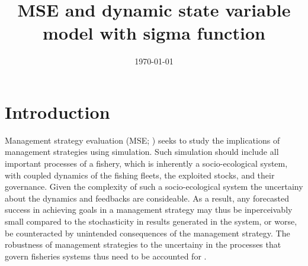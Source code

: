 \documentclass[12pt,oneline,a4paper,numbib]{ouparticle}
\numberwithin{equation}{subsection} %
\begin{document}
\title{MSE and dynamic state variable model with sigma function}

\author{%
\address{European Commission, Joint Research Centre (JRC), Sustainable Resources Directorate, Water and Marine Resources Unit, Via Enrico Fermi 2749, 21027 Ispra, Italy.}
\and
{}
\address{Wageningen Marine Research, PO Box 68, 1970 AB IJmuiden, The Netherlands.}
}


\date{\today}


\maketitle


\section{Introduction}

Management strategy evaluation (MSE; \cite{Bunnefeld2011, Sainsbury2000, Smith1994}) seeks to study the implications of management strategies using simulation\cite{Punt2016}. Such simulation should include all important processes of a fishery, which is inherently a socio-ecological system, with coupled dynamics of the fishing fleets, the exploited stocks, and their governance\cite{Punt2016,Rasemeyer2007}. Given the complexity of such a socio-ecological system the uncertainy about the dynamics and feedbacks are consideable. As a result, any forecasted success in achieving goals in a management strategy may thus be inperceivably small compared to the stochasticity in results generated in the system, or worse, be counteracted by unintended consequences of the management strategy. The robustness of management strategies to the uncertainy in the processes that govern fisheries systems thus need to be accounted for \cite{Andersen2010, Kell2007, Prellezo2016, Punt2016}. 
\end{document}

